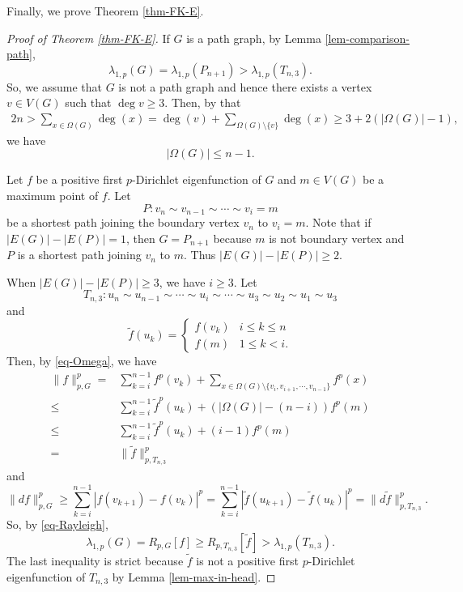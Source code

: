 \documentclass[12pt]{amsart}
\def\wt{\widetilde}
\theoremstyle{definition}
\theoremstyle{remark}
\numberwithin{equation}{section}
\begin{document}
Finally, we prove Theorem \ref{thm-FK-E}.
\begin{proof}[Proof of Theorem \ref{thm-FK-E}]
If $G$ is a path graph, by Lemma \ref{lem-comparison-path}, $$\lambda_{1,p}(G)=\lambda_{1,p}(P_{n+1})>\lambda_{1,p}(T_{n,3}).$$
 So, we assume that $G$ is not a path graph and hence there exists a vertex $v\in V(G)$ such that  $\deg v\geq 3$. Then, by that
\begin{equation*}
\begin{split}
2n>\sum_{x\in\Omega(G)}\deg(x)=\deg (v)+\sum_{\Omega(G)\setminus\{v\}}\deg(x)\geq 3+2(|\Omega(G)|-1),
\end{split}
\end{equation*}
we have
\begin{equation}\label{eq-Omega}
|\Omega(G)|\leq n-1.
\end{equation}

Let $f$ be a positive first $p$-Dirichlet eigenfunction of $G$ and $m\in V(G)$ be a maximum point of $f$. Let
$$P: v_n\sim v_{n-1}\sim \cdots\sim v_i=m$$
be a shortest path joining the boundary vertex $v_n$ to $v_i=m$. Note that if $|E(G)|-|E(P)|=1$, then $G={P_{n+1}}$ because $m$ is not boundary vertex and $P$ is a shortest path joining $v_n$ to $m$. Thus $|E(G)|-|E(P)|\geq 2$.

When $|E(G)|-|E(P)|\geq 3$, we have $i\geq 3$. Let
$$T_{n,3}:u_n\sim u_{n-1}\sim\cdots\sim u_{i}\sim \cdots\sim u_3\sim u_2\sim u_1\sim u_3$$
and
$$\wt f(u_k)=\left\{\begin{array}{ll}f(v_k)&i\leq k\leq n\\
f(m)&1\leq k<i.
\end{array}\right.$$
Then, by \eqref{eq-Omega}, we have
\begin{equation*}
\begin{split}
\|f\|_{p,G}^p=&\sum_{k=i}^{n-1}f^p(v_k)+\sum_{x\in\Omega(G)\setminus\{v_i,v_{i+1},\cdots,v_{n-1}\}}f^p(x)\\
\leq&\sum_{k=i}^{n-1} \wt f^p(u_k)+\left(|\Omega(G)|-(n-i)\right)f^p(m)\\
\leq&\sum_{k=i}^{n-1} \wt f^p(u_k)+(i-1)f^p(m)\\
=&\|\wt f\|_{p,T_{n,3}}^{p}
\end{split}
\end{equation*}
and
\begin{equation*}
\|df\|_{p,G}^p\geq \sum_{k=i}^{n-1}|f(v_{k+1})-f(v_k)|^p=\sum_{k=i}^{n-1}|\wt f(u_{k+1})-\wt f(u_k)|^p=\|d \wt f\|_{p,T_{n,3}}^p.
\end{equation*}
So, by \eqref{eq-Rayleigh},
\begin{equation}
\lambda_{1,p}(G)=R_{p,G}[f]\geq R_{p,T_{n,3}}[\wt f]> \lambda_{1,p}(T_{n,3}).
\end{equation}
The last inequality is strict because $\wt f$ is not a positive first $p$-Dirichlet eigenfunction of $T_{n,3}$ by Lemma \ref{lem-max-in-head}.


\end{proof}
\end{document}
